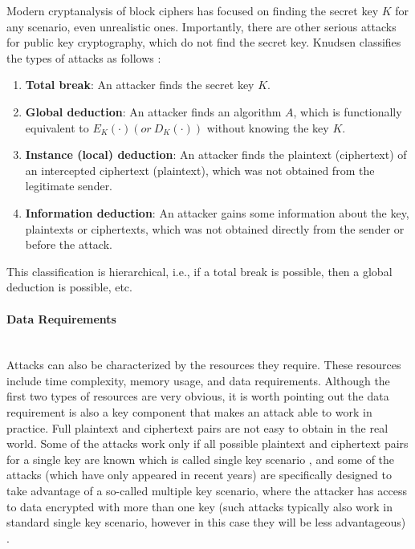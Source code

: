 Modern cryptanalysis of block ciphers has focused on finding the secret key $K$ for any scenario, even unrealistic ones. Importantly, there are other serious attacks for public key cryptography, which do not find the secret key. Knudsen classifies the types of attacks as follows \cite{knudsen1994block}:
\begin{enumerate}
	\item \textbf{Total break}: An attacker finds the secret key $K$.
	\item \textbf{Global deduction}: An attacker finds an algorithm $A$, which is functionally equivalent to $E_{K}(\cdot)(or\ D_{K}(\cdot))$ without knowing the key $K$.
	\item \textbf{Instance (local) deduction}: An attacker finds the plaintext (ciphertext) of an intercepted ciphertext (plaintext), which was not obtained from the legitimate sender.
	\item \textbf{Information deduction}: An attacker gains some information about the key, plaintexts or ciphertexts, which was not obtained directly from the sender or before the attack.
\end{enumerate} 
This classification is hierarchical, i.e., if a total break is possible, then a global deduction is possible, etc.

\paragraph{Data Requirements}  \mbox{} \\
Attacks can also be characterized by the resources they require. These resources include time complexity, memory usage, and data requirements. Although the first two types of resources are very obvious, it is worth pointing out the data requirement is also a key component that makes an attack able to work in practice. Full plaintext and ciphertext pairs are not easy to obtain in the real world. Some of the attacks work only if all possible plaintext and ciphertext pairs for a single key are known which is called single key scenario \cite{bouillaguet2012low}, and some of the attacks (which have only appeared in recent years) are specifically designed to take advantage of a so-called multiple key
scenario, where the attacker has access to data encrypted with more than
one key (such attacks typically also work in standard single key
scenario, however in this case they will be less advantageous) \cite{gostac,courtois2013cryptanalysis}. 
